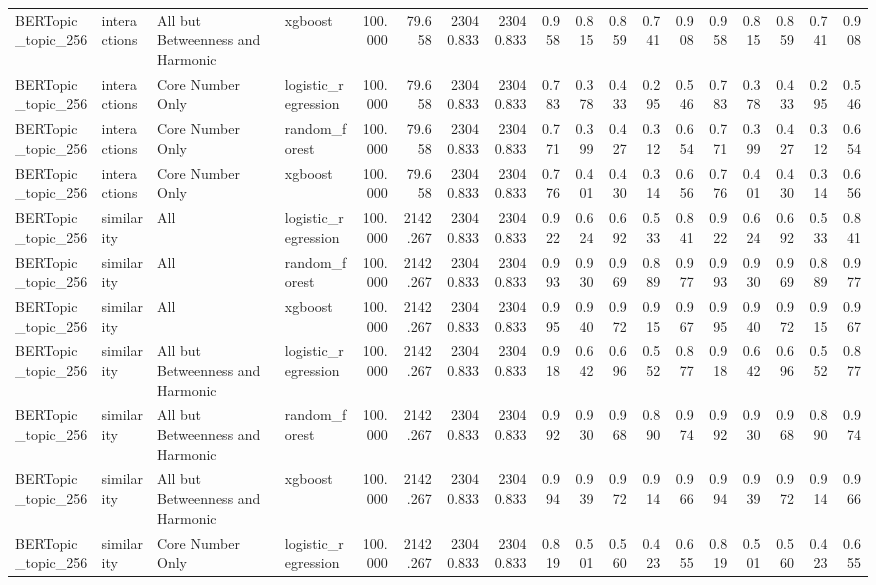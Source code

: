 \begin{tabular}{llllrrrrrrrrrrrrrr}
BERTopic_topic_256 & interactions & All but Betweenness and Harmonic & xgboost & 100.000 & 79.658 & 23040.833 & 23040.833 & 0.958 & 0.815 & 0.859 & 0.741 & 0.908 & 0.958 & 0.815 & 0.859 & 0.741 & 0.908 \\
BERTopic_topic_256 & interactions & Core Number Only & logistic_regression & 100.000 & 79.658 & 23040.833 & 23040.833 & 0.783 & 0.378 & 0.433 & 0.295 & 0.546 & 0.783 & 0.378 & 0.433 & 0.295 & 0.546 \\
BERTopic_topic_256 & interactions & Core Number Only & random_forest & 100.000 & 79.658 & 23040.833 & 23040.833 & 0.771 & 0.399 & 0.427 & 0.312 & 0.654 & 0.771 & 0.399 & 0.427 & 0.312 & 0.654 \\
BERTopic_topic_256 & interactions & Core Number Only & xgboost & 100.000 & 79.658 & 23040.833 & 23040.833 & 0.776 & 0.401 & 0.430 & 0.314 & 0.656 & 0.776 & 0.401 & 0.430 & 0.314 & 0.656 \\
BERTopic_topic_256 & similarity & All & logistic_regression & 100.000 & 2142.267 & 23040.833 & 23040.833 & 0.922 & 0.624 & 0.692 & 0.533 & 0.841 & 0.922 & 0.624 & 0.692 & 0.533 & 0.841 \\
BERTopic_topic_256 & similarity & All & random_forest & 100.000 & 2142.267 & 23040.833 & 23040.833 & 0.993 & 0.930 & 0.969 & 0.889 & 0.977 & 0.993 & 0.930 & 0.969 & 0.889 & 0.977 \\
BERTopic_topic_256 & similarity & All & xgboost & 100.000 & 2142.267 & 23040.833 & 23040.833 & 0.995 & 0.940 & 0.972 & 0.915 & 0.967 & 0.995 & 0.940 & 0.972 & 0.915 & 0.967 \\
BERTopic_topic_256 & similarity & All but Betweenness and Harmonic & logistic_regression & 100.000 & 2142.267 & 23040.833 & 23040.833 & 0.918 & 0.642 & 0.696 & 0.552 & 0.877 & 0.918 & 0.642 & 0.696 & 0.552 & 0.877 \\
BERTopic_topic_256 & similarity & All but Betweenness and Harmonic & random_forest & 100.000 & 2142.267 & 23040.833 & 23040.833 & 0.992 & 0.930 & 0.968 & 0.890 & 0.974 & 0.992 & 0.930 & 0.968 & 0.890 & 0.974 \\
BERTopic_topic_256 & similarity & All but Betweenness and Harmonic & xgboost & 100.000 & 2142.267 & 23040.833 & 23040.833 & 0.994 & 0.939 & 0.972 & 0.914 & 0.966 & 0.994 & 0.939 & 0.972 & 0.914 & 0.966 \\
BERTopic_topic_256 & similarity & Core Number Only & logistic_regression & 100.000 & 2142.267 & 23040.833 & 23040.833 & 0.819 & 0.501 & 0.560 & 0.423 & 0.655 & 0.819 & 0.501 & 0.560 & 0.423 & 0.655 \\

\end{tabular}
